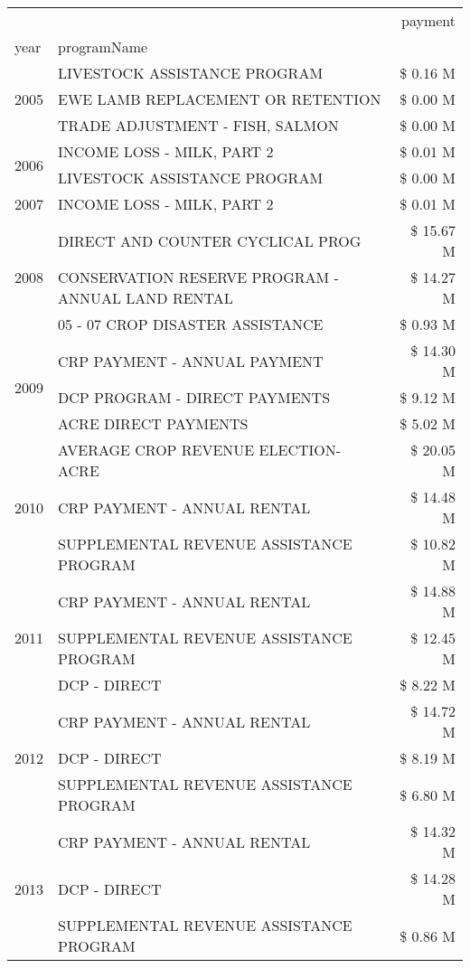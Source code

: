 \begin{tabular}{llr}
\toprule
 &  & payment \\
year & programName &  \\
\midrule
\multirow[t]{3}{*}{2005} & LIVESTOCK ASSISTANCE PROGRAM & \$ 0.16 M \\
 & EWE LAMB REPLACEMENT OR RETENTION & \$ 0.00 M \\
 & TRADE ADJUSTMENT - FISH, SALMON & \$ 0.00 M \\
\cline{1-3}
\multirow[t]{2}{*}{2006} & INCOME LOSS - MILK, PART 2 & \$ 0.01 M \\
 & LIVESTOCK ASSISTANCE PROGRAM & \$ 0.00 M \\
\cline{1-3}
2007 & INCOME LOSS - MILK, PART 2 & \$ 0.01 M \\
\cline{1-3}
\multirow[t]{3}{*}{2008} & DIRECT AND COUNTER CYCLICAL PROG & \$ 15.67 M \\
 & CONSERVATION RESERVE PROGRAM - ANNUAL LAND RENTAL & \$ 14.27 M \\
 & 05 - 07 CROP DISASTER ASSISTANCE & \$ 0.93 M \\
\cline{1-3}
\multirow[t]{3}{*}{2009} & CRP PAYMENT - ANNUAL PAYMENT & \$ 14.30 M \\
 & DCP PROGRAM - DIRECT PAYMENTS & \$ 9.12 M \\
 & ACRE DIRECT PAYMENTS & \$ 5.02 M \\
\cline{1-3}
\multirow[t]{3}{*}{2010} & AVERAGE CROP REVENUE ELECTION-ACRE & \$ 20.05 M \\
 & CRP PAYMENT - ANNUAL RENTAL & \$ 14.48 M \\
 & SUPPLEMENTAL REVENUE ASSISTANCE PROGRAM & \$ 10.82 M \\
\cline{1-3}
\multirow[t]{3}{*}{2011} & CRP PAYMENT - ANNUAL RENTAL & \$ 14.88 M \\
 & SUPPLEMENTAL REVENUE ASSISTANCE PROGRAM & \$ 12.45 M \\
 & DCP - DIRECT & \$ 8.22 M \\
\cline{1-3}
\multirow[t]{3}{*}{2012} & CRP PAYMENT - ANNUAL RENTAL & \$ 14.72 M \\
 & DCP - DIRECT & \$ 8.19 M \\
 & SUPPLEMENTAL REVENUE ASSISTANCE PROGRAM & \$ 6.80 M \\
\cline{1-3}
\multirow[t]{3}{*}{2013} & CRP PAYMENT - ANNUAL RENTAL & \$ 14.32 M \\
 & DCP - DIRECT & \$ 14.28 M \\
 & SUPPLEMENTAL REVENUE ASSISTANCE PROGRAM & \$ 0.86 M \\

\end{tabular}
